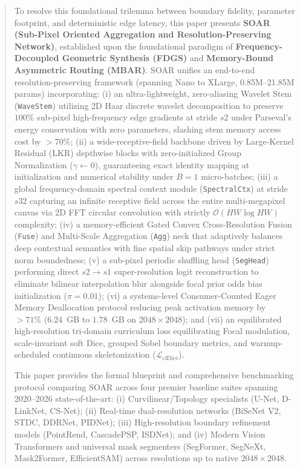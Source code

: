 \documentclass[11pt,a4paper]{article}
\begin{document}
\begin{abstract}
To resolve this foundational trilemma between boundary fidelity, parameter footprint, and deterministic edge latency, this paper presents \textbf{SOAR (Sub-Pixel Oriented Aggregation and Resolution-Preserving Network)}, established upon the foundational paradigm of \textbf{Frequency-Decoupled Geometric Synthesis (FDGS)} and \textbf{Memory-Bound Asymmetric Routing (MBAR)}. SOAR unifies an end-to-end resolution-preserving framework (spanning Nano to XLarge, 0.85M--21.85M params) incorporating: (i) an ultra-lightweight, zero-aliasing Wavelet Stem (\texttt{WaveStem}) utilizing 2D Haar discrete wavelet decomposition to preserve $100\%$ sub-pixel high-frequency edge gradients at stride $s2$ under Parseval's energy conservation with zero parameters, slashing stem memory access cost by $>70\%$; (ii) a wide-receptive-field backbone driven by Large-Kernel Residual (LKR) depthwise blocks with zero-initialized Group Normalization ($\gamma \leftarrow 0$), guaranteeing exact identity mapping at initialization and numerical stability under $B=1$ micro-batches; (iii) a global frequency-domain spectral context module (\texttt{SpectralCtx}) at stride $s32$ capturing an infinite receptive field across the entire multi-megapixel canvas via 2D FFT circular convolution with strictly $\mathcal{O}(HW \log HW)$ complexity; (iv) a memory-efficient Gated Convex Cross-Resolution Fusion (\texttt{Fuse}) and Multi-Scale Aggregation (\texttt{Agg}) neck that adaptively balances deep contextual semantics with fine spatial skip pathways under strict norm boundedness; (v) a sub-pixel periodic shuffling head (\texttt{SegHead}) performing direct $s2 \to s1$ super-resolution logit reconstruction to eliminate bilinear interpolation blur alongside focal prior odds bias initialization ($\pi = 0.01$); (vi) a systems-level Consumer-Counted Eager Memory Deallocation protocol reducing peak activation memory by $>71\%$ ($6.24$~GB to $1.78$~GB on $2048\times 2048$); and (vii) an equilibrated high-resolution tri-domain curriculum loss equilibrating Focal modulation, scale-invariant soft Dice, grouped Sobel boundary metrics, and warmup-scheduled continuous skeletonization ($\mathcal{L}_{\text{clDice}}$).

This paper provides the formal blueprint and comprehensive benchmarking protocol comparing SOAR across four premier baseline suites spanning 2020--2026 state-of-the-art: (i) Curvilinear/Topology specialists (U-Net, D-LinkNet, CS-Net); (ii) Real-time dual-resolution networks (BiSeNet V2, STDC, DDRNet, PIDNet); (iii) High-resolution boundary refinement models (PointRend, CascadePSP, ISDNet); and (iv) Modern Vision Transformers and universal mask segmenters (SegFormer, SegNeXt, Mask2Former, EfficientSAM) across resolutions up to native $2048\times 2048$.
\end{abstract}
\end{document}
